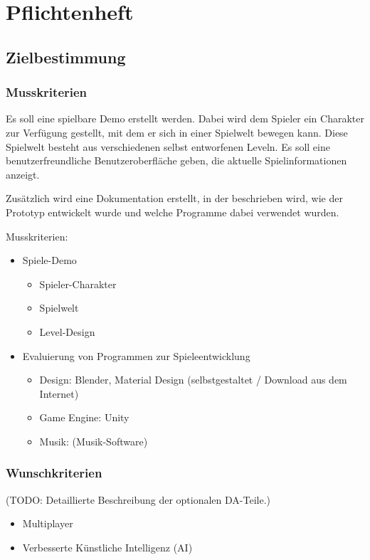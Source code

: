 \pagebreak

\chapter{Pflichtenheft}
\section{Zielbestimmung}
\subsection{Musskriterien}

Es soll eine spielbare Demo erstellt werden. Dabei wird dem Spieler ein Charakter zur Verfügung gestellt, mit dem er sich in einer Spielwelt bewegen kann. Diese Spielwelt besteht aus verschiedenen selbst entworfenen Leveln. Es soll eine benutzerfreundliche Benutzeroberfläche geben, die aktuelle Spielinformationen anzeigt.

Zusätzlich wird eine Dokumentation erstellt, in der beschrieben wird, wie der Prototyp entwickelt wurde und welche Programme dabei verwendet wurden.

Musskriterien:
\begin{itemize}
  \item Spiele-Demo
  \begin{itemize}
    \item Spieler-Charakter
    \item Spielwelt
    \item Level-Design
  \end{itemize}
  \item Evaluierung von Programmen zur Spieleentwicklung
  \begin{itemize}
    \item Design: Blender, Material Design (selbstgestaltet / Download aus dem Internet)
    \item Game Engine: Unity
    \item Musik: (Musik-Software)
  \end{itemize}
\end{itemize}

\subsection{Wunschkriterien}
(TODO: 
Detaillierte Beschreibung der optionalen DA-Teile.)

\begin{itemize}
  \item Multiplayer
  \item Verbesserte Künstliche Intelligenz (AI)
\end{itemize}

